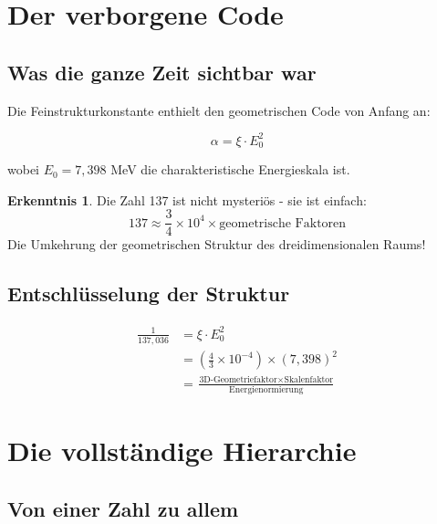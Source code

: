 \documentclass[12pt,a4paper]{article}
\theoremstyle{definition}
\newtheorem{erkenntnis}{Erkenntnis}[section]
\begin{document}
	\section{Der verborgene Code}
	
	\subsection{Was die ganze Zeit sichtbar war}
	
	Die Feinstrukturkonstante enthielt den geometrischen Code von Anfang an:
	
	\begin{equation}
		\alpha = \xi \cdot E_0^2
	\end{equation}
	
	wobei $E_0 = 7,398$ MeV die charakteristische Energieskala ist.
	
	\begin{erkenntnis}
		Die Zahl 137 ist nicht mysteriös - sie ist einfach:
		\begin{equation}
			137 \approx \frac{3}{4} \times 10^4 \times \text{geometrische Faktoren}
		\end{equation}
		Die Umkehrung der geometrischen Struktur des dreidimensionalen Raums!
	\end{erkenntnis}
	
	\subsection{Entschlüsselung der Struktur}
	
	\begin{fundamental}
		\begin{align}
			\frac{1}{137,036} &= \xi \cdot E_0^2\\
			&= \left(\frac{4}{3} \times 10^{-4}\right) \times (7,398)^2\\
			&= \frac{\text{3D-Geometriefaktor} \times \text{Skalenfaktor}}{\text{Energienormierung}}
		\end{align}
	\end{fundamental}
	
	\section{Die vollständige Hierarchie}
	
	\subsection{Von einer Zahl zu allem}
	
\end{document}
